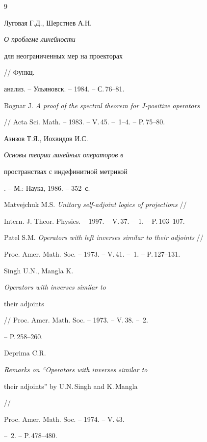 \begin{thebibliography}{9}







Луговая Г.Д., Шерстнев А.Н. {\em О проблеме линейности


для неограниченных мер на проекторах} // Функц.


анализ. -- Ульяновск. -- 1984. -- С.\,76--81.




Bognar J. {\em A proof of the spectral theorem for $J$-positive operators}


// Acta Sci. Math. -- 1983. -- V.\,45. -- \No\,1--4. -- P.\,75--80.




Азизов Т.Я., Иохвидов И.С. {\em Основы теории линейных операторов в


пространствах с индефинитной метрикой}. -- М.: Наука, 1986. -- 352~с.




Matvejchuk M.S. {\em Unitary self-adjoint logics of projections} //


Intern. J. Theor. Physics. -- 1997. -- V.\,37. -- \No\,1. -- P.\,103--107.




Patel S.M. {\em Operators with left inverses similar to their adjoints} //


Proc. Amer. Math. Soc. -- 1973. -- V.\,41. -- \No\,1. -- P.\,127--131.




Singh U.N., Mangla K. {\em Operators with inverses similar to


their adjoints} // Proc. Amer. Math. Soc. -- 1973. -- V.\,38. -- \No\,2.


-- P.\,258--260.




Deprima C.R. {\em Remarks on ``Operators with inverses similar to


their adjoints'' by U.N.\,Singh and K.\,Mangla} //


Proc. Amer. Math. Soc. -- 1974. -- V.\,43.


-- \No\,2. -- P.\,478--480.





\end{thebibliography}





\vskip 2cm












\label{end}





